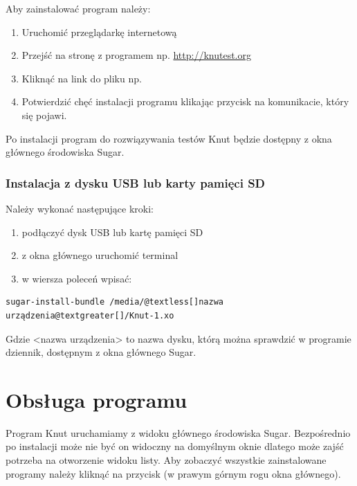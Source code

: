 \documentclass[letterpaper,10pt,polish]{sphinxmanual}
\begin{document}
Aby zainstalować program należy:
\begin{enumerate}
\item {} 
Uruchomić przeglądarkę internetową

\item {} 
Przejść na stronę z programem np. \href{http://knutest.org}{http://knutest.org}

\item {} 
Kliknąć na link do pliku np. 

\item {} 
Potwierdzić chęć instalacji programu klikając przycisk  na komunikacie, który się pojawi.

\end{enumerate}

Po instalacji program do rozwiązywania testów Knut będzie dostępny z okna głównego środowiska Sugar.


\subsection{Instalacja z dysku USB lub karty pamięci SD}
\label{index:instalacja-z-dysku-usb-lub-karty-pamieci-sd}
Należy wykonać następujące kroki:
\begin{enumerate}
\item {} 
podłączyć dysk USB lub kartę pamięci SD

\item {} 
z okna głównego uruchomić terminal

\item {} 
w wiersza poleceń wpisać:

\end{enumerate}

\begin{Verbatim}[commandchars=@\[\]]
sugar-install-bundle /media/@textless[]nazwa urządzenia@textgreater[]/Knut-1.xo
\end{Verbatim}

Gdzie \textless{}nazwa urządzenia\textgreater{} to nazwa dysku, którą można sprawdzić w programie dziennik, dostępnym z okna głównego Sugar.


\chapter{Obsługa programu}
\label{index:obsluga-programu}\label{index:id4}
Program Knut uruchamiamy z widoku głównego środowiska Sugar. Bezpośrednio po instalacji może nie być on widoczny na domyślnym oknie dlatego może zajść potrzeba na otworzenie widoku listy. Aby zobaczyć wszystkie zainstalowane programy należy kliknąć na przycisk  (w prawym górnym rogu okna głównego).
\end{document}
